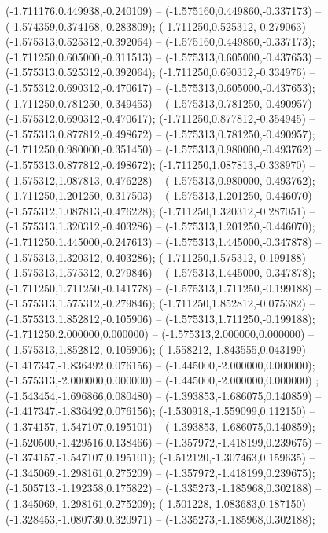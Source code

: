  (-1.711176,0.449938,-0.240109) -- (-1.575160,0.449860,-0.337173) -- (-1.574359,0.374168,-0.283809);
 (-1.711250,0.525312,-0.279063) -- (-1.575313,0.525312,-0.392064) -- (-1.575160,0.449860,-0.337173);
 (-1.711250,0.605000,-0.311513) -- (-1.575313,0.605000,-0.437653) -- (-1.575313,0.525312,-0.392064);
 (-1.711250,0.690312,-0.334976) -- (-1.575312,0.690312,-0.470617) -- (-1.575313,0.605000,-0.437653);
 (-1.711250,0.781250,-0.349453) -- (-1.575313,0.781250,-0.490957) -- (-1.575312,0.690312,-0.470617);
 (-1.711250,0.877812,-0.354945) -- (-1.575313,0.877812,-0.498672) -- (-1.575313,0.781250,-0.490957);
 (-1.711250,0.980000,-0.351450) -- (-1.575313,0.980000,-0.493762) -- (-1.575313,0.877812,-0.498672);
 (-1.711250,1.087813,-0.338970) -- (-1.575312,1.087813,-0.476228) -- (-1.575313,0.980000,-0.493762);
 (-1.711250,1.201250,-0.317503) -- (-1.575313,1.201250,-0.446070) -- (-1.575312,1.087813,-0.476228);
 (-1.711250,1.320312,-0.287051) -- (-1.575313,1.320312,-0.403286) -- (-1.575313,1.201250,-0.446070);
 (-1.711250,1.445000,-0.247613) -- (-1.575313,1.445000,-0.347878) -- (-1.575313,1.320312,-0.403286);
 (-1.711250,1.575312,-0.199188) -- (-1.575313,1.575312,-0.279846) -- (-1.575313,1.445000,-0.347878);
 (-1.711250,1.711250,-0.141778) -- (-1.575313,1.711250,-0.199188) -- (-1.575313,1.575312,-0.279846);
 (-1.711250,1.852812,-0.075382) -- (-1.575313,1.852812,-0.105906) -- (-1.575313,1.711250,-0.199188);
 (-1.711250,2.000000,0.000000) -- (-1.575313,2.000000,0.000000) -- (-1.575313,1.852812,-0.105906);
 (-1.558212,-1.843555,0.043199) -- (-1.417347,-1.836492,0.076156) -- (-1.445000,-2.000000,0.000000);
 (-1.575313,-2.000000,0.000000) -- (-1.445000,-2.000000,0.000000) ;
 (-1.543454,-1.696866,0.080480) -- (-1.393853,-1.686075,0.140859) -- (-1.417347,-1.836492,0.076156);
 (-1.530918,-1.559099,0.112150) -- (-1.374157,-1.547107,0.195101) -- (-1.393853,-1.686075,0.140859);
 (-1.520500,-1.429516,0.138466) -- (-1.357972,-1.418199,0.239675) -- (-1.374157,-1.547107,0.195101);
 (-1.512120,-1.307463,0.159635) -- (-1.345069,-1.298161,0.275209) -- (-1.357972,-1.418199,0.239675);
 (-1.505713,-1.192358,0.175822) -- (-1.335273,-1.185968,0.302188) -- (-1.345069,-1.298161,0.275209);
 (-1.501228,-1.083683,0.187150) -- (-1.328453,-1.080730,0.320971) -- (-1.335273,-1.185968,0.302188);
